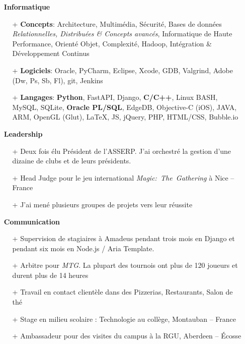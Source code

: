 \documentclass{res}
\begin{document}
\begin{resume}
    \begin{itemize}
    \item[] \faLaptopCode~\textbf{Informatique}
        \begin{itemize}
            \item[+] \textbf{Concepts}: Architecture, Multim\'edia, S\'ecurit\'e, Bases de donn\'ees \textit{Relationnelles, Distribu\'ees \& Concepts avanc\'es}, Informatique de Haute Performance, Orient\'e Objet, Complexit\'e, Hadoop, Int\'egration \& D\'eveloppement Continus
            \item[+] \textbf{Logiciels}: Oracle, PyCharm, Eclipse, Xcode, GDB, Valgrind, Adobe (Dw, Ps, Sb, Fl), git, Jenkins
            \item[+] \textbf{Langages}: \textbf{Python}, FastAPI, Django, \textbf{C/C++}, Linux BASH, MySQL, SQLite, \textbf{Oracle PL/SQL}, EdgeDB, Objective-C (iOS), JAVA, ARM, OpenGL (Glut), \LaTeX{}, JS, jQuery, PHP, HTML/CSS, Bubble.io
        \end{itemize}
    \end{itemize}

    \begin{itemize}
    \item[] \faHandshake[regular]~\textbf{Leadership}
        \begin{itemize}
            \item[+] Deux fois \'elu Pr\'esident de l'ASSERP. J'ai orchestr\'e la gestion d'une dizaine de clubs et de leurs pr\'esidents.
            \item[+] Head Judge pour le jeu international \textit{Magic:~The~Gathering} \`a Nice -- France
            \item[+] J'ai men\'e plusieurs groupes de projets vers leur r\'eussite
        \end{itemize}
    \end{itemize}

    \begin{itemize}
    \item[] \faComments[regular]~\textbf{Communication}
        \begin{itemize}
            \item[+] Supervision de stagiaires \`a Amadeus pendant trois mois en Django et pendant six mois en Node.js / Aria Template.
            \item[+] Arbitre pour \textit{MTG}. La plupart des tournois ont plus de 120 joueurs et durent plus de 14 heures
            \item[+] Travail en contact client\`ele dans des Pizzerias, Restaurants, Salon de th\'e
            \item[+] Stage en milieu scolaire : Technologie au coll\`ege, Montauban -- France
            \item[+]  Ambassadeur pour des visites du campus \`a la RGU, Aberdeen -- \'Ecosse
        \end{itemize}
    \end{itemize}


\end{resume}
\end{document}
